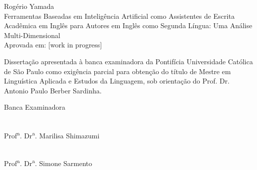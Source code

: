 \begin{titlepage}
\begin{center}
    \end{center}
\end{titlepage}

\begin{titlepage}
    Rogério Yamada\\
    Ferramentas Baseadas em Inteligência Artificial como Assistentes de Escrita Acadêmica em Inglês para Autores em Inglês como Segunda Língua: Uma Análise Multi-Dimensional\\
    Aprovada em: [work in progress]

    \vspace{2cm}
    Dissertação apresentada à banca examinadora da Pontifícia Universidade Católica de São Paulo como exigência parcial para obtenção do título de Mestre em Linguística Aplicada e Estudos da Linguagem, sob orientação do Prof. Dr. Antonio Paulo Berber Sardinha.

    \vspace{4cm}
    Banca Examinadora

    \vspace{3cm}
    \makebox[0.75\textwidth]{\hrulefill}\\
    Prof\textsuperscript{a}. Dr\textsuperscript{a}. Marilisa Shimazumi

    \vspace{3cm}
    \makebox[0.75\textwidth]{\hrulefill}\\
    Prof\textsuperscript{a}. Dr\textsuperscript{a}. Simone Sarmento

\end{titlepage}


